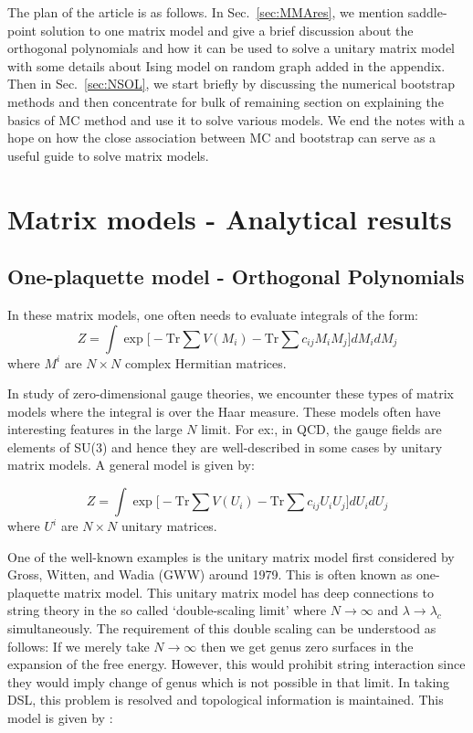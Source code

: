 \documentclass[11pt]{article}
\begin{document}
The plan of the article is as follows. In Sec.~\ref{sec:MMAres}, we mention saddle-point solution 
to one matrix model and give a brief discussion about the orthogonal polynomials and how it can be used to 
solve a unitary matrix model with some details about Ising model on random graph added in the appendix. 
Then in Sec.~\ref{sec:NSOL}, we start briefly by discussing the numerical bootstrap methods 
and then concentrate for bulk of remaining section on
explaining the basics of MC method and use it to solve various models. 
We end the notes with a hope on how the close association between MC 
and bootstrap can serve as a useful guide to solve matrix models. 


\section{\label{sec:MMAres}Matrix models - Analytical results} 

\subsection{One-plaquette model - Orthogonal Polynomials} 

In these matrix models, one often needs to evaluate integrals of the form:
\begin{equation}
Z = \int \exp\Bigg[  -\mathrm{Tr} \sum V(M_{i})  -  \mathrm{Tr} \sum c_{ij}M_{i}M_{j}   \Bigg] dM_{i} dM_{j}
\end{equation}
where $M^{i}$ are $N \times N$ complex Hermitian matrices. 


In study of zero-dimensional gauge theories, we encounter these types of matrix models where the integral is over the Haar measure. These models often have interesting features in the large $N$ limit.
For ex:, in QCD, the gauge fields are elements of SU(3) and hence they are well-described in some cases by unitary matrix models. A general model is given by:



\begin{equation}
	Z = \int \exp\Bigg[  -\mbox{Tr} \sum V(U_{i})  -  \mbox{Tr} \sum c_{ij}U_{i}U_{j}   \Bigg] dU_{i} dU_{j}
\end{equation}
where $U^{i}$ are $N \times N$ unitary matrices. 

One of the well-known examples is the unitary matrix model first considered by Gross, Witten, and Wadia (GWW) around 1979. This is often known as one-plaquette matrix model. This unitary matrix model 
has deep connections to string theory in the so called `double-scaling limit' where $N \to \infty$ and $\lambda \to \lambda_{c}$ simultaneously. The requirement of this double scaling can be understood as follows: If we merely take $N \to \infty$ then we get genus zero surfaces in the expansion of the free energy. However, this would prohibit string interaction since they would imply change of genus which is not possible in that limit. In taking DSL, this problem is resolved and topological information is maintained. This model is given by : 
\end{document}
